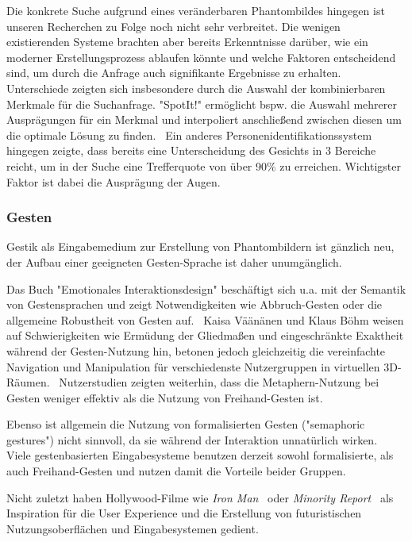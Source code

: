 \documentclass{sigchi-ext}
\begin{document}
Die konkrete Suche aufgrund eines veränderbaren Phantombildes hingegen ist unseren Recherchen zu Folge noch nicht sehr verbreitet. Die wenigen existierenden Systeme brachten aber bereits Erkenntnisse darüber, wie ein moderner Erstellungsprozess ablaufen könnte und welche Faktoren entscheidend sind, um durch die Anfrage auch signifikante Ergebnisse zu erhalten.
Unterschiede zeigten sich insbesondere durch die Auswahl der
kombinierbaren Merkmale für die Suchanfrage. "SpotIt!" ermöglicht
bspw. die Auswahl mehrerer Ausprägungen für ein Merkmal und interpoliert anschließend zwischen diesen um die optimale Lösung zu finden.~\cite{brunelli1996} Ein anderes Personenidentifikationssystem hingegen zeigte, dass bereits eine Unterscheidung des Gesichts in 3 Bereiche reicht, um in der Suche eine Trefferquote von über 90\% zu erreichen. Wichtigster Faktor ist dabei die Ausprägung der Augen. ~\cite{bobulski2012}

\subsubsection{Gesten}
Gestik als Eingabemedium zur Erstellung von Phantombildern ist gänzlich neu, der Aufbau einer geeigneten Gesten-Sprache ist daher unumgänglich. 

Das Buch "Emotionales Interaktionsdesign" beschäftigt sich
 u.a. mit der Semantik von Gestensprachen und zeigt Notwendigkeiten wie Abbruch-Gesten oder die allgemeine Robustheit von Gesten auf.~\cite{Dorau11} Kaisa Väänänen und Klaus Böhm weisen auf Schwierigkeiten wie Ermüdung der Gliedmaßen und eingeschränkte Exaktheit während der Gesten-Nutzung hin, betonen jedoch gleichzeitig die vereinfachte Navigation und Manipulation für verschiedenste Nutzergruppen in virtuellen 3D-Räumen.~\cite{vrs:book}
Nutzerstudien zeigten weiterhin, dass die
Metaphern-Nutzung bei Gesten weniger effektiv als die Nutzung von
Freihand-Gesten ist.~\cite{3dinteraction:book}

Ebenso ist allgemein die Nutzung von formalisierten Gesten ("semaphoric gestures") nicht sinnvoll, da sie während der Interaktion unnatürlich wirken.~\cite{Quek:2002:MHD:568513.568514, Wexelblat:1997:RCG:647590.728557}
Viele gestenbasierten Eingabesysteme benutzen derzeit sowohl formalisierte, als auch
Freihand-Gesten und nutzen damit die Vorteile beider Gruppen.~\cite{3dinteraction:book}

Nicht zuletzt haben Hollywood-Filme wie \textit{Iron Man}~\cite{ironman:movie} oder \textit{Minority Report}~\cite{minorityreport:movie} als Inspiration für die User Experience und die Erstellung von futuristischen Nutzungsoberflächen und Eingabesystemen gedient.
\end{document}
